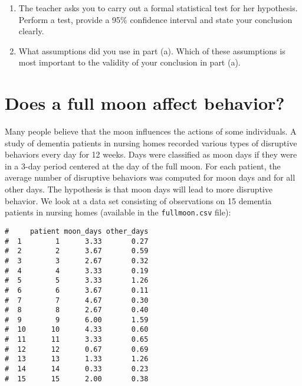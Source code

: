 \documentclass[letterpaper,9pt,twoside,printwatermark=false]{pinp}
\providecommand{\tightlist}{%
  \setlength{\itemsep}{0pt}\setlength{\parskip}{0pt}}
\begin{document}
\begin{enumerate}
\def\labelenumi{\alph{enumi}.}
\tightlist
\item
  The teacher asks you to carry out a formal statistical test for her
  hypothesis. Perform a test, provide a 95\% confidence interval and
  state your conclusion clearly.
\item
  What assumptions did you use in part (a). Which of these assumptions
  is most important to the validity of your conclusion in part (a).
\end{enumerate}

\section{Does a full moon affect
behavior?}\label{does-a-full-moon-affect-behavior}

Many people believe that the moon influences the actions of some
individuals. A study of dementia patients in nursing homes recorded
various types of disruptive behaviors every day for 12 weeks. Days were
classified as moon days if they were in a 3-day period centered at the
day of the full moon. For each patient, the average number of disruptive
behaviors was computed for moon days and for all other days. The
hypothesis is that moon days will lead to more disruptive behavior. We
look at a data set consisting of observations on 15 dementia patients in
nursing homes (available in the \texttt{fullmoon.csv} file):

\begin{Shaded}
\begin{Highlighting}[]
\StringTok{ }\NormalTok{(}\NormalTok{)}
\end{Highlighting}
\end{Shaded}

\begin{ShadedResult}
\begin{verbatim}
#     patient moon_days other_days
#  1        1      3.33       0.27
#  2        2      3.67       0.59
#  3        3      2.67       0.32
#  4        4      3.33       0.19
#  5        5      3.33       1.26
#  6        6      3.67       0.11
#  7        7      4.67       0.30
#  8        8      2.67       0.40
#  9        9      6.00       1.59
#  10      10      4.33       0.60
#  11      11      3.33       0.65
#  12      12      0.67       0.69
#  13      13      1.33       1.26
#  14      14      0.33       0.23
#  15      15      2.00       0.38
\end{verbatim}
\end{ShadedResult}
\end{document}
